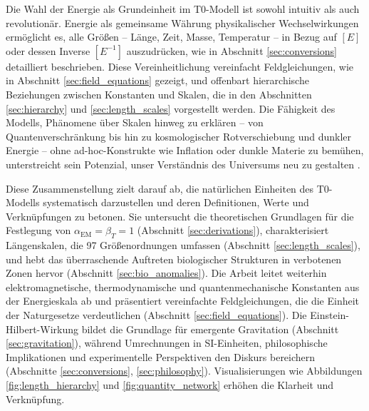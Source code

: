 \documentclass[12pt,a4paper]{article}
\begin{document}
	Die Wahl der Energie als Grundeinheit im T0-Modell ist sowohl intuitiv als auch revolutionär. Energie als gemeinsame Währung physikalischer Wechselwirkungen ermöglicht es, alle Größen – Länge, Zeit, Masse, Temperatur – in Bezug auf \([E]\) oder dessen Inverse \([E^{-1}]\) auszudrücken, wie in Abschnitt \ref{sec:conversions} detailliert beschrieben. Diese Vereinheitlichung vereinfacht Feldgleichungen, wie in Abschnitt \ref{sec:field_equations} gezeigt, und offenbart hierarchische Beziehungen zwischen Konstanten und Skalen, die in den Abschnitten \ref{sec:hierarchy} und \ref{sec:length_scales} vorgestellt werden. Die Fähigkeit des Modells, Phänomene über Skalen hinweg zu erklären – von Quantenverschränkung bis hin zu kosmologischer Rotverschiebung und dunkler Energie – ohne ad-hoc-Konstrukte wie Inflation oder dunkle Materie zu bemühen, unterstreicht sein Potenzial, unser Verständnis des Universums neu zu gestalten \cite{pascher_energiedynamik_2025}.
	
	Diese Zusammenstellung zielt darauf ab, die natürlichen Einheiten des T0-Modells systematisch darzustellen und deren Definitionen, Werte und Verknüpfungen zu betonen. Sie untersucht die theoretischen Grundlagen für die Festlegung von \(\alpha_{\text{EM}} = \beta_T = 1\) (Abschnitt \ref{sec:derivations}), charakterisiert Längenskalen, die 97 Größenordnungen umfassen (Abschnitt \ref{sec:length_scales}), und hebt das überraschende Auftreten biologischer Strukturen in verbotenen Zonen hervor (Abschnitt \ref{sec:bio_anomalies}). Die Arbeit leitet weiterhin elektromagnetische, thermodynamische und quantenmechanische Konstanten aus der Energieskala ab und präsentiert vereinfachte Feldgleichungen, die die Einheit der Naturgesetze verdeutlichen (Abschnitt \ref{sec:field_equations}). Die Einstein-Hilbert-Wirkung bildet die Grundlage für emergente Gravitation (Abschnitt \ref{sec:gravitation}), während Umrechnungen in SI-Einheiten, philosophische Implikationen und experimentelle Perspektiven den Diskurs bereichern (Abschnitte \ref{sec:conversions}, \ref{sec:philosophy}). Visualisierungen wie Abbildungen \ref{fig:length_hierarchy} und \ref{fig:quantity_network} erhöhen die Klarheit und Verknüpfung.
	
\end{document}
